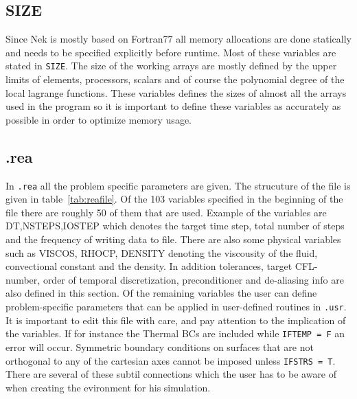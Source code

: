 \subsection{SIZE}
Since Nek is mostly based on Fortran77 all memory allocations are done statically and needs to be specified explicitly 
before runtime. Most of these variables are stated in \verb|SIZE|. The size of the working arrays 
are mostly defined by the upper limits of elements, processors, scalars and of course the polynomial degree
of the local lagrange functions. These variables defines the sizes of almost all 
the arrays used in the program so it is important to define these variables as accurately 
as possible in order to optimize memory usage.
%
\subsection{.rea}
In \verb|.rea| all the problem specific parameters are given. The strucuture of the file is given in table~\ref{tab:reafile}.
Of the 103 variables specified in the beginning of the file there are roughly 50 of them that are used. Example of the variables
are DT,NSTEPS,IOSTEP which denotes the target time step, total number of steps and the frequency of writing data to file. 
There are also some physical variables such as VISCOS, RHOCP, DENSITY denoting the viscousity of the fluid, convectional constant and 
the density. In addition tolerances, target CFL-number, order of temporal discretization, 
preconditioner and de-aliasing info are also defined in this section.
Of the remaining variables the user can define problem-specific parameters that 
can be applied in user-defined routines in \verb|.usr|.
It is important to edit this file with care, and pay attention to the implication of the 
variables. If for instance the Thermal BCs are included while \verb|IFTEMP = F| an error 
will occur. Symmetric boundary conditions on surfaces that are not orthogonal to any of the 
cartesian axes cannot be imposed unless \verb|IFSTRS = T|. There are several of these subtil
connections which the user has to be aware of when creating the evironment for his simulation.
%
